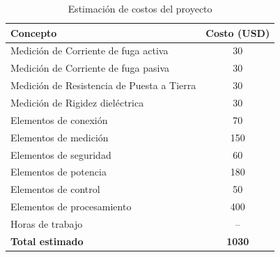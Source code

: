 \documentclass[a4paper,12pt]{article}
\begin{document}
\begin{table}[H]
\centering
\begin{tabular}{|l|c|}
\hline
\textbf{Concepto} & \textbf{Costo (USD)} \\ \hline
Medición de Corriente de fuga activa & 30 \\ \hline
Medición de Corriente de fuga pasiva & 30 \\ \hline
Medición de Resistencia de Puesta a Tierra & 30 \\ \hline
Medición de Rigidez dieléctrica & 30 \\ \hline
Elementos de conexión & 70 \\ \hline
Elementos de medición & 150 \\ \hline
Elementos de seguridad & 60 \\ \hline
Elementos de potencia & 180 \\ \hline
Elementos de control & 50 \\ \hline
Elementos de procesamiento & 400 \\ \hline
Horas de trabajo & -- \\ \hline
\textbf{Total estimado} & \textbf{1030} \\ \hline
\end{tabular}
\caption{Estimación de costos del proyecto}
\label{tab:costos}
\end{table}
\end{document}
